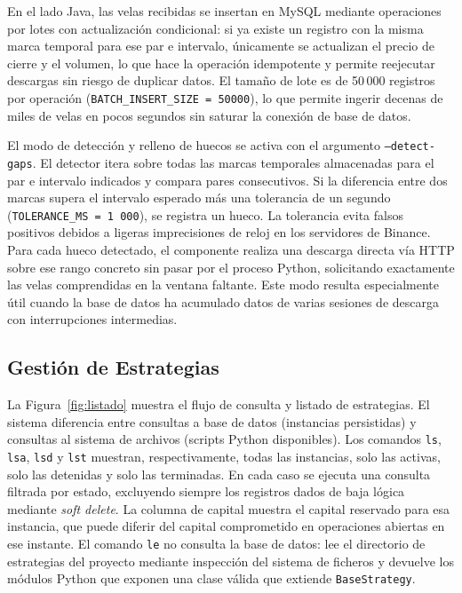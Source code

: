 En el lado Java, las velas recibidas se insertan en MySQL mediante operaciones
por lotes con actualización condicional: si ya existe un registro con la misma
marca temporal para ese par e intervalo, únicamente se actualizan el precio de
cierre y el volumen, lo que hace la operación idempotente y permite
reejecutar descargas sin riesgo de duplicar datos. El tamaño de lote es de
50\,000 registros por operación (\texttt{BATCH\_INSERT\_SIZE = 50000}), lo
que permite ingerir decenas de miles de velas en pocos segundos sin saturar la
conexión de base de datos.

El modo de detección y relleno de huecos se activa con el argumento
\texttt{--detect-gaps}. El detector itera sobre todas las marcas temporales
almacenadas para el par e intervalo indicados y compara pares consecutivos. Si
la diferencia entre dos marcas supera el intervalo esperado más una tolerancia
de un segundo (\texttt{TOLERANCE\_MS = 1\,000}), se registra un hueco. La
tolerancia evita falsos positivos debidos a ligeras imprecisiones de reloj en
los servidores de Binance. Para cada hueco detectado, el componente realiza
una descarga directa vía HTTP sobre ese rango concreto sin pasar por el
proceso Python, solicitando exactamente las velas comprendidas en la ventana
faltante. Este modo resulta especialmente útil cuando la base de datos ha
acumulado datos de varias sesiones de descarga con interrupciones intermedias.

\subsection{Gestión de Estrategias}

La Figura~\ref{fig:listado} muestra el flujo de consulta y listado de
estrategias. El sistema diferencia entre consultas a base de datos (instancias
persistidas) y consultas al sistema de archivos (scripts Python disponibles).
Los comandos \texttt{ls}, \texttt{lsa}, \texttt{lsd} y \texttt{lst} muestran,
respectivamente, todas las instancias, solo las activas, solo las detenidas y
solo las terminadas. En cada caso se ejecuta una consulta filtrada por estado,
excluyendo siempre los registros dados de baja lógica mediante
\textit{soft delete}. La columna de capital muestra el capital reservado para
esa instancia, que puede diferir del capital comprometido en operaciones
abiertas en ese instante. El comando \texttt{le} no consulta la base de datos:
lee el directorio de estrategias del proyecto mediante inspección del sistema
de ficheros y devuelve los módulos Python que exponen una clase válida que
extiende \texttt{BaseStrategy}.

